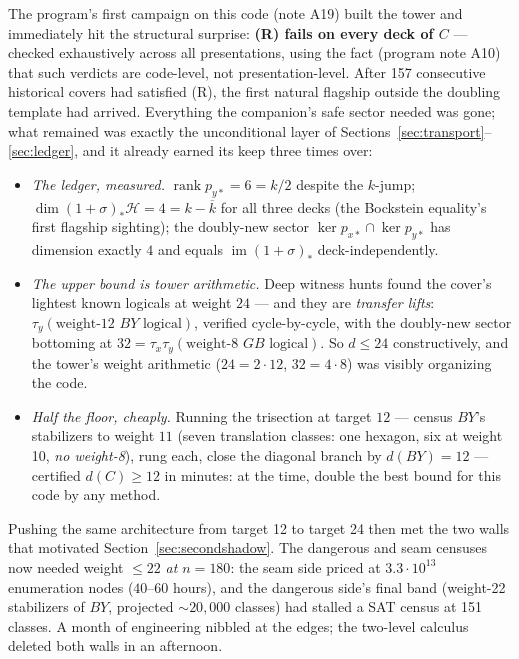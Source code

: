 \documentclass[11pt]{article}
\theoremstyle{plain}
\theoremstyle{definition}
\theoremstyle{remark}
\newcommand{\clH}{\mathcal{H}}
\newcommand{\ov}[1]{\overline{#1}}
\begin{document}
The program's first campaign on this code (note A19) built the tower and
immediately hit the structural surprise: \textbf{(R) fails on every deck
of $C$} --- checked exhaustively across all presentations, using the fact
(program note A10) that such verdicts are code-level, not
presentation-level. After 157 consecutive historical covers had satisfied
(R), the first natural flagship outside the doubling template had
arrived. Everything the companion's safe sector needed was gone; what
remained was exactly the unconditional layer of
Sections~\ref{sec:transport}--\ref{sec:ledger}, and it already earned its
keep three times over:

\begin{itemize}[leftmargin=2em]
\item \emph{The ledger, measured.} $\operatorname{rank} p_{y*} = 6 =
  k/2$ despite the $k$-jump; $\dim (1+\sigma)_*\clH = 4 = k - \ov k$ for
  all three decks (the Bockstein equality's first flagship sighting);
  the doubly-new sector $\ker p_{x*} \cap \ker p_{y*}$ has dimension
  exactly $4$ and equals $\operatorname{im}(1+\sigma)_*$ deck-independently.
\item \emph{The upper bound is tower arithmetic.} Deep witness hunts
  found the cover's lightest known logicals at weight $24$ --- and they
  are \emph{transfer lifts}: $\tau_y(\text{weight-12 } BY
  \text{ logical})$, verified cycle-by-cycle, with the doubly-new sector
  bottoming at $32 = \tau_x \tau_y(\text{weight-8 } GB\text{ logical})$.
  So $d \leq 24$ constructively, and the tower's weight arithmetic
  ($24 = 2 \cdot 12$, $32 = 4 \cdot 8$) was visibly organizing the code.
\item \emph{Half the floor, cheaply.} Running the trisection at target
  $12$ --- census $BY$'s stabilizers to weight $11$ (seven translation
  classes: one hexagon, six at weight 10, \emph{no weight-8}), rung each,
  close the diagonal branch by $d(BY) = 12$ --- certified $d(C) \geq 12$
  in minutes: at the time, double the best bound for this code by any
  method.
\end{itemize}

Pushing the same architecture from target 12 to target 24 then met the
two walls that motivated Section~\ref{sec:secondshadow}. The dangerous
and seam censuses now needed weight $\leq 22$ \emph{at $n = 180$}: the
seam side priced at $3.3 \cdot 10^{13}$ enumeration nodes ($40$--$60$
hours), and the dangerous side's final band (weight-22 stabilizers of
$BY$, projected ${\sim}20{,}000$ classes) had stalled a SAT census at
151 classes. A month of engineering nibbled at the edges; the two-level
calculus deleted both walls in an afternoon.
\end{document}
